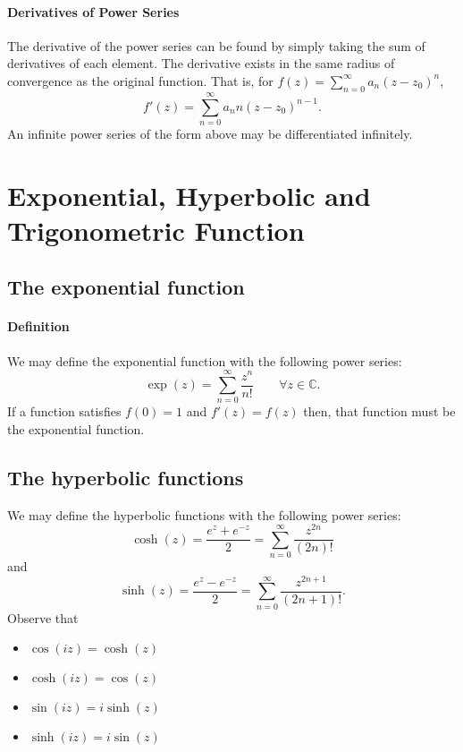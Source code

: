 \documentclass[12pt, letterpaper]{article}
\begin{document}
    \paragraph{Derivatives of Power Series}
    The derivative of the power series can be found by simply taking the 
    sum of derivatives of each element. The derivative exists in the same
    radius of convergence as the original function.
    That is, for \(f(z) = \sum_{n=0}^{\infty} a_n (z-z_0)^n\),
    \[f'(z) = \sum_{n=0}^{\infty}a_n n (z-z_0)^{n-1}.\]
    An infinite power series of the form above may be differentiated infinitely.
    

    \section{Exponential, Hyperbolic and Trigonometric Function}
    \subsection{The exponential function}

    \paragraph{Definition}
    We may define the exponential function with the following power series:
    \[\exp(z) = \sum_{n=0}^{\infty} \frac{z^n}{n!} \quad\quad
    \forall z\in\mathbb{C}.\]
    If a function satisfies \(f(0) = 1\) and \(f'(z) = f(z)\) then, that 
    function must be the exponential function.

    \subsection{The hyperbolic functions}
    We may define the hyperbolic functions with the following power series:
    \[
        \cosh(z) = \frac{e^z + e^{-z}}{2} = \sum_{n=0}^{\infty} \frac{z^{2n}}{(2n)!}
    \]
    and 
    \[
        \sinh(z) = \frac{e^z - e^{-z}}{2}
        = \sum_{n=0}^{\infty} \frac{z^{2n+1}}{(2n+1)!}.
    \]
    Observe that
    \begin{itemize}
        \item \(\cos(iz) = \cosh(z)\)
        \item \(\cosh(iz) = \cos(z)\)
        \item \(\sin(iz) = i\sinh(z)\)
        \item \(\sinh(iz) = i\sin(z)\)
    \end{itemize}
\end{document}
